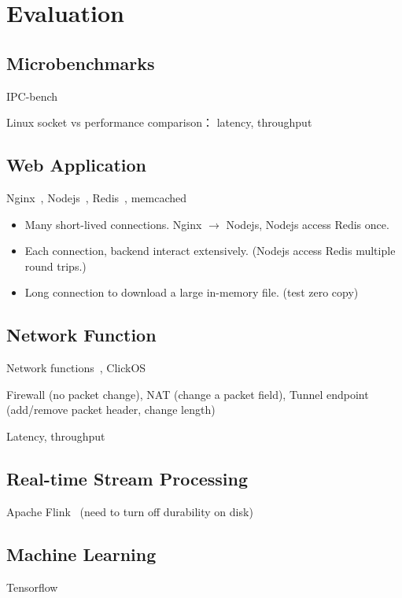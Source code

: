 \section{Evaluation}
\label{sec:evaluation}

\subsection{Microbenchmarks}

IPC-bench~\cite{ipc-bench}

Linux socket vs \sys performance comparison： latency, throughput

\subsection{Web Application}

Nginx~\cite{nginx}, Nodejs~\cite{nodejs}, Redis~\cite{redis}, memcached~\cite{memcached}

\begin{itemize}
	\item Many short-lived connections. Nginx $\rightarrow$ Nodejs, Nodejs access Redis once.
	\item Each connection, backend interact extensively. (Nodejs access Redis multiple round trips.)
	\item Long connection to download a large in-memory file. (test zero copy)
\end{itemize}

\subsection{Network Function}

Network functions~\cite{li2016clicknp}, ClickOS~\cite{martins2014clickos}

Firewall (no packet change), NAT (change a packet field), Tunnel endpoint (add/remove packet header, change length)

Latency, throughput

\subsection{Real-time Stream Processing}

Apache Flink~\cite{carbone2015apache} (need to turn off durability on disk)

\subsection{Machine Learning}

Tensorflow~\cite{abadi2016tensorflow}